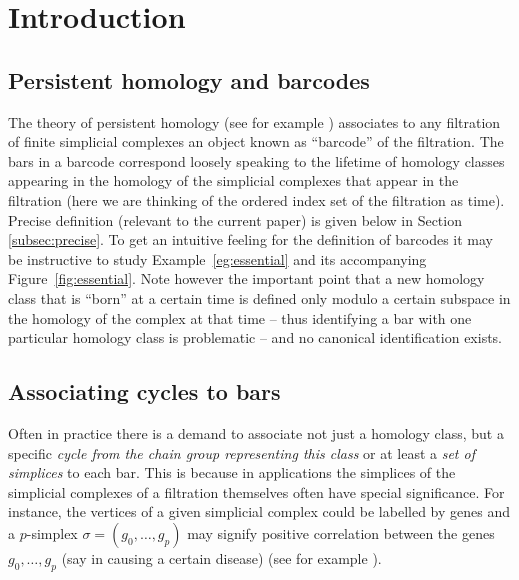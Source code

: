 \documentclass[11pt]{amsart}
\theoremstyle{theorem}
\theoremstyle{remark}
\theoremstyle{definition}
\begin{document}
\maketitle

\tableofcontents
\section{Introduction}
\subsection{Persistent homology and barcodes}
The theory of persistent homology (see for example \cite{Edelsbrunner-Harer2010}) 
associates to any filtration of finite simplicial
complexes an object known as ``barcode'' of the filtration. 
The bars in a barcode correspond
loosely speaking to the lifetime of homology classes appearing in the homology of the 
simplicial complexes that appear in the filtration (here we are thinking of the ordered index set of the filtration
as time).
Precise definition (relevant to the current paper) is given below in Section~
\ref{subsec:precise}. To get an intuitive feeling for the definition of barcodes it may be instructive to study 
Example~\ref{eg:essential} and its accompanying
Figure~\ref{fig:essential}. 
Note however the important point that a new homology class that is ``born'' at a certain time  is defined only modulo a certain subspace in the homology of the complex at that time  -- thus identifying a bar with one particular homology class is problematic -- and no canonical identification exists.

\subsection{Associating cycles to bars}
Often in practice there is a demand to associate not just a homology class, but a specific 
\emph{cycle from the chain group representing this class} or at least a \emph{set of simplices} to each bar. 
This is because in applications
the simplices of the simplicial complexes of a filtration themselves  often have special significance. For instance, the vertices of a given simplicial complex could be labelled by
genes and a $p$-simplex $\sigma = (g_0,\ldots,g_p)$ may signify positive correlation between the genes 
$g_0,\ldots,g_p$ (say in causing a certain disease) (see for example
\cite{lockwood2014,Gurnari-et-al}).
\end{document}
